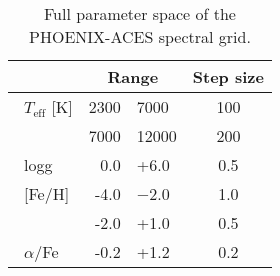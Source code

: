 
\begin{table}
    \centering 
    \caption{Full parameter space of the PHOENIX-ACES spectral grid.}
    \begin{tabular}{lr@{ -- }lc}    %
        \toprule
        & \multicolumn{2}{c}{Range}       & Step size\\
        \midrule
        \ \(T_{\textrm{eff}}\) [K] &  2300 & 7000  & 100 \\
        &  7000 & 12000 & 200 \\ 
        \  logg     &  0.0 & +6.0   & 0.5 \\ 
        \ [Fe/H]   &  -4.0 & $-$2.0  & 1.0 \\    %
        &  -2.0 & +1.0  & 0.5 \\  
        \  \(\alpha\)/Fe &  -0.2 & +1.2  & 0.2 \\
        \bottomrule
    \end{tabular}
    \label{tab:phoenix}
\end{table}